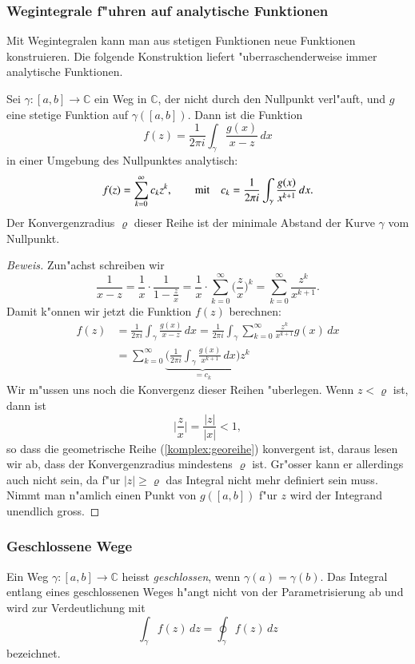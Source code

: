 %
%
\subsubsection{Wegintegrale f"uhren auf analytische Funktionen}
Mit Wegintegralen kann man aus stetigen Funktionen neue Funktionen
konstruieren.
Die folgende Konstruktion liefert "uberraschenderweise immer
analytische Funktionen.
\begin{satz}
\label{komplex:integralanalytisch}
Sei $\gamma\colon [a,b]\to\mathbb C$ ein Weg in $\mathbb C$, der nicht
durch den Nullpunkt verl"auft, und $g$ eine stetige Funktion
auf $\gamma([a,b])$.
Dann ist die Funktion
\[
f(z) = \frac1{2\pi i}\int_\gamma \frac{g(x)}{x-z}\,dx
\]
in einer Umgebung des Nullpunktes analytisch:
\[
f(z) = \sum_{k=0}^\infty c_k z^k,\qquad
\text{mit\quad}
c_k=\frac1{2\pi i}\int_\gamma \frac{g(x)}{x^{k+1}}\,dx.
\]
Der Konvergenzradius $\varrho$ dieser Reihe ist der minimale Abstand der
Kurve $\gamma$ vom Nullpunkt.
\end{satz}

\begin{proof}[Beweis]
Zun"achst schreiben wir
\begin{equation}
\frac{1}{x-z}
=
\frac1x\cdot \frac{1}{1-\textstyle\frac{z}{x}}
=
\frac1x\cdot \sum_{k=0}^\infty \biggl(\frac{z}{x}\biggr)^k
=
\sum_{k=0}^\infty \frac{z^k}{x^{k+1}}.
\label{komplex:georeihe}
\end{equation}
Damit k"onnen wir jetzt die Funktion $f(z)$ berechnen:
\begin{align*}
f(z)
&=
\frac1{2\pi i} \int_{\gamma} \frac{g(x)}{x-z}\,dx
=
\frac1{2\pi i} \int_{\gamma} \sum_{k=0}^\infty \frac{z^k}{x^{k+1}}g(x)\,dx
\\
&=
\sum_{k=0}^\infty
\underbrace{\biggl(\frac1{2\pi i} \int_{\gamma} \frac{g(x)}{x^{k+1}}\,dx\biggr)}_{\textstyle =c_k}
z^k
\end{align*}
Wir m"ussen uns noch die Konvergenz dieser Reihen "uberlegen.
Wenn $z<\varrho$ ist, dann ist 
\[
\biggl|\frac{z}{x}\biggr| 
=
\frac{|z|}{|x|}
<1,
\]
so dass die geometrische Reihe (\ref{komplex:georeihe}) konvergent ist,
daraus lesen wir ab, dass der Konvergenzradius mindestens $\varrho$
ist.
Gr"osser kann er allerdings auch nicht sein, da f"ur $|z|\ge \varrho$
das Integral nicht mehr definiert sein muss.
Nimmt man n"amlich einen Punkt von $g([a,b])$ f"ur $z$ wird der Integrand
unendlich gross.
\end{proof}

%
%
\subsubsection{Geschlossene Wege}
\begin{definition}
Ein Weg $\gamma\colon[a,b]\to\mathbb C$ heisst {\em geschlossen}, wenn
$\gamma(a)=\gamma(b)$.
Das Integral entlang eines geschlossenen Weges h"angt nicht von der
Parametrisierung ab und wird zur Verdeutlichung mit
\[
\int_{\gamma}f(z)\,dz
=
\oint_{\gamma}f(z)\,dz
\]
bezeichnet.
\end{definition}


